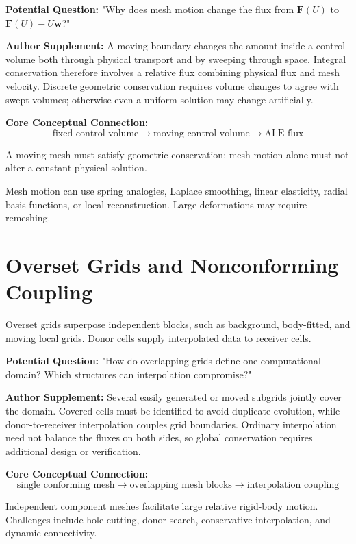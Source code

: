 \begin{authornote}
\textbf{Potential Question:}
"Why does mesh motion change the flux from \(\bm F(U)\) to \(\bm F(U)-U\bm w\)?"

\textbf{Author Supplement:}
A moving boundary changes the amount inside a control volume both through physical transport and by sweeping through space. Integral conservation therefore involves a relative flux combining physical flux and mesh velocity. Discrete geometric conservation requires volume changes to agree with swept volumes; otherwise even a uniform solution may change artificially.

\textbf{Core Conceptual Connection:}
\[
\text{fixed control volume}
\longrightarrow
\text{moving control volume}
\longrightarrow
\text{ALE flux}
\]
\end{authornote}

A moving mesh must satisfy geometric conservation: mesh motion alone must not alter a constant physical solution.

Mesh motion can use spring analogies, Laplace smoothing, linear elasticity, radial basis functions, or local reconstruction. Large deformations may require remeshing.

\section{Overset Grids and Nonconforming Coupling}
Overset grids superpose independent blocks, such as background, body-fitted, and moving local grids. Donor cells supply interpolated data to receiver cells.

\begin{authornote}
\textbf{Potential Question:}
"How do overlapping grids define one computational domain? Which structures can interpolation compromise?"

\textbf{Author Supplement:}
Several easily generated or moved subgrids jointly cover the domain. Covered cells must be identified to avoid duplicate evolution, while donor-to-receiver interpolation couples grid boundaries. Ordinary interpolation need not balance the fluxes on both sides, so global conservation requires additional design or verification.

\textbf{Core Conceptual Connection:}
\[
\text{single conforming mesh}
\longrightarrow
\text{overlapping mesh blocks}
\longrightarrow
\text{interpolation coupling}
\]
\end{authornote}

Independent component meshes facilitate large relative rigid-body motion. Challenges include hole cutting, donor search, conservative interpolation, and dynamic connectivity.


